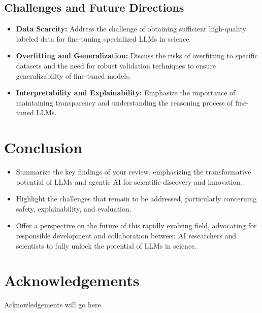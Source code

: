\documentclass{article}
\begin{document}
\subsection{Challenges and Future Directions}
\begin{itemize}
    \item \textbf{Data Scarcity:} Address the challenge of obtaining sufficient high-quality labeled data for fine-tuning specialized LLMs in science.
    \item \textbf{Overfitting and Generalization:} Discuss the risks of overfitting to specific datasets and the need for robust validation techniques to ensure generalizability of fine-tuned models.
    \item \textbf{Interpretability and Explainability:} Emphasize the importance of maintaining transparency and understanding the reasoning process of fine-tuned LLMs.
\end{itemize}

\section{Conclusion}
\begin{itemize}
    \item Summarize the key findings of your review, emphasizing the transformative potential of LLMs and agentic AI for scientific discovery and innovation.
    \item Highlight the challenges that remain to be addressed, particularly concerning safety, explainability, and evaluation.
    \item Offer a perspective on the future of this rapidly evolving field, advocating for responsible development and collaboration between AI researchers and scientists to fully unlock the potential of LLMs in science.
\end{itemize}

\section*{Acknowledgements}
Acknowledgements will go here.
\end{document}
